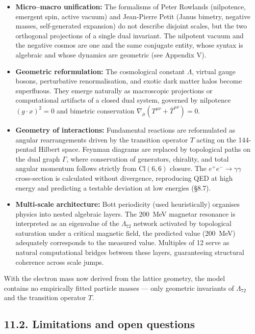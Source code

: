 \documentclass[11pt]{article}
\begin{document}
\begin{itemize}
    \item \textbf{Micro–macro unification:} The formalisms of Peter Rowlands (nilpotence, emergent spin, active vacuum) and Jean-Pierre Petit (Janus bimetry, negative masses, self-generated expansion) do not describe disjoint scales, but the two orthogonal projections of a single dual invariant. The nilpotent vacuum and the negative cosmos are one and the same conjugate entity, whose syntax is algebraic and whose dynamics are geometric (see Appendix V).
    \item \textbf{Geometric reformulation:} The cosmological constant $\Lambda$, virtual gauge bosons, perturbative renormalisation, and exotic dark matter halos become superfluous. They emerge naturally as macroscopic projections or computational artifacts of a closed dual system, governed by nilpotence $(g\cdot x)^2=0$ and bimetric conservation $\nabla_\mu(T^{\mu\nu}+\bar{T}^{\mu\nu})=0$.
    \item \textbf{Geometry of interactions:} Fundamental reactions are reformulated as angular rearrangements driven by the transition operator $T$ acting on the 144-pentad Hilbert space. Feynman diagrams are replaced by topological paths on the dual graph $\Gamma$, where conservation of generators, chirality, and total angular momentum follows strictly from $\text{Cl}(6,6)$ closure. The $e^+e^- \to \gamma\gamma$ cross-section is calculated without divergence, reproducing QED at high energy and predicting a testable deviation at low energies (§8.7).
    \item \textbf{Multi-scale architecture:} Bott periodicity (used heuristically) organises physics into nested algebraic layers. The 200~MeV magnetar resonance is interpreted as an eigenvalue of the $\Lambda_{72}$ network activated by topological saturation under a critical magnetic field, the predicted value (200~MeV) adequately corresponds to the measured value. Multiples of 12 serve as natural computational bridges between these layers, guaranteeing structural coherence across scale jumps.
\end{itemize}

With the electron mass now derived from the lattice geometry, the model
contains no empirically fitted particle masses --- only geometric
invariants of \(\Lambda_{72}\) and the transition operator \(T\).

\hypertarget{limitations-and-open-questions}{%
\subsection{11.2. Limitations and open
questions}\label{limitations-and-open-questions}}
\end{document}
